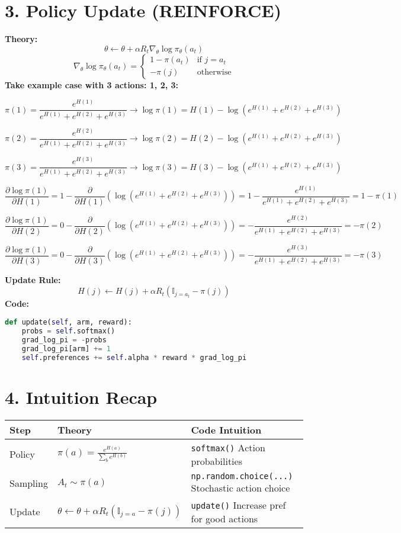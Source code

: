 \documentclass{article}
\begin{document}
\section*{3. Policy Update (REINFORCE)}
\textbf{Theory:}
\[
\theta \leftarrow \theta + \alpha R_t \nabla_\theta \log \pi_\theta(a_t)
\]
\[
\nabla_\theta \log \pi_\theta(a_t) = \begin{cases}
1 - \pi(a_t) & \text{if } j = a_t \\
-\pi(j) & \text{otherwise}
\end{cases}
\]
\textbf{Take example case with 3 actions: 1, 2, 3:}

\[
{\pi(1)=} \frac{e^{H(1)}}{e^{H(1)} + e^{H(2)}+ e^{H(3)}}
\rightarrow {\log \pi(1) = {H(1)}- \log(e^{H(1)} + e^{H(2)}+ e^{H(3)})}
\]

\[
{\pi(2)=} \frac{e^{H(2)}}{e^{H(1)} + e^{H(2)}+ e^{H(3)}}
\rightarrow {\log \pi(2) = {H(2)}- \log(e^{H(1)} + e^{H(2)}+ e^{H(3)})}
\]

\[
{\pi(3)=} \frac{e^{H(3)}}{e^{H(1)} + e^{H(2)}+ e^{H(3)}}
\rightarrow {\log \pi(3) = {H(3)}- \log(e^{H(1)} + e^{H(2)}+ e^{H(3)})}
\]



\[
\frac{\partial \log \pi(1)}{\partial H(1)} = 
1 - \frac{\partial}{\partial H(1)} (\log(e^{H(1)} + e^{H(2)} + e^{H(3)})) =
1 - \frac{e^{H(1)}}{e^{H(1)} + e^{H(2)} + e^{H(3)}} = 
1 - \pi(1)
\]

\[
\frac{\partial \log \pi(1)}{\partial H(2)} = 
0 - \frac{\partial}{\partial H(2)} (\log(e^{H(1)} + e^{H(2)} + e^{H(3)})) =
- \frac{e^{H(2)}}{e^{H(1)} + e^{H(2)} + e^{H(3)}} = 
- \pi(2)
\]


\[
\frac{\partial \log \pi(1)}{\partial H(3)} = 
0 - \frac{\partial}{\partial H(3)} (\log(e^{H(1)} + e^{H(2)} + e^{H(3)})) =
- \frac{e^{H(3)}}{e^{H(1)} + e^{H(2)} + e^{H(3)}} = 
- \pi(3)
\]

\textbf{Update Rule:}
\[
H(j) \leftarrow H(j) + \alpha R_t (\mathbb{I}_{j=a_t} - \pi(j))
\]
\textbf{Code:}
\begin{lstlisting}[language=Python]
def update(self, arm, reward):
    probs = self.softmax()
    grad_log_pi = -probs
    grad_log_pi[arm] += 1
    self.preferences += self.alpha * reward * grad_log_pi
\end{lstlisting}

\section*{4. Intuition Recap}
\begin{tabular}{|l|l|l|}
\hline
Step & Theory & Code Intuition \\
\hline
Policy & $\pi(a) = \frac{e^{H(a)}}{\sum_b e^{H(b)}}$ & \texttt{softmax()} \quad Action probabilities \\
Sampling & $A_t \sim \pi(a)$ & \texttt{np.random.choice(...)} \quad Stochastic action choice \\
Update & $\theta \leftarrow \theta + \alpha R_t (\mathbb{I}_{j=a} - \pi(j))$ & \texttt{update()} \quad Increase pref for good actions \\
\hline
\end{tabular}
\end{document}
